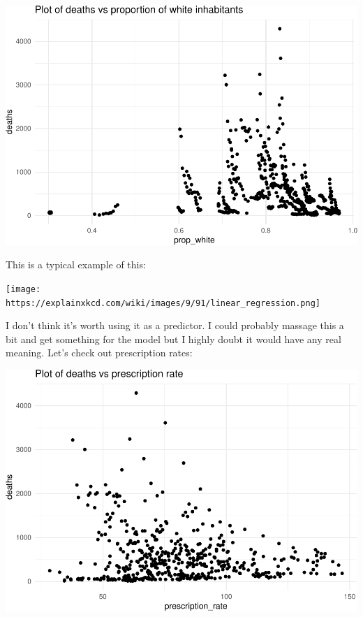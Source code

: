 \documentclass[]{article}
\newenvironment{Shaded}{\begin{snugshade}}{\end{snugshade}}
\newcommand{\DataTypeTok}[1]{\textcolor[rgb]{0.13,0.29,0.53}{#1}}
\newcommand{\KeywordTok}[1]{\textcolor[rgb]{0.13,0.29,0.53}{\textbf{#1}}}
\newcommand{\NormalTok}[1]{#1}
\newcommand{\OperatorTok}[1]{\textcolor[rgb]{0.81,0.36,0.00}{\textbf{#1}}}
\newcommand{\StringTok}[1]{\textcolor[rgb]{0.31,0.60,0.02}{#1}}
\begin{document}
\includegraphics{Assignment_1_files/figure-latex/plots6-1.pdf}

This is a typical example of this:

\texttt{[image: https://explainxkcd.com/wiki/images/9/91/linear\_regression.png]}

I don't think it's worth using it as a predictor. I could probably
massage this a bit and get something for the model but I highly doubt it
would have any real meaning. Let's check out prescription rates:

\begin{Shaded}
\end{Shaded}

\includegraphics{Assignment_1_files/figure-latex/plots7-1.pdf}
\end{document}
